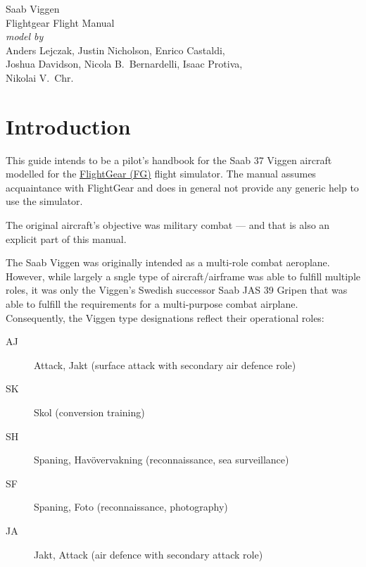 \usepackage[english]{babel}
\usepackage[utf8]{inputenc}
\usepackage[T1]{fontenc}

\usepackage{graphicx}
\usepackage{hyperref}
\usepackage{wallpaper}
\usepackage{xcolor}
\usepackage{geometry}

\pagestyle{headings}


\begin{titlepage}
  \centering
  \sf
  {\Huge Saab  Viggen}
  \\[1cm]
  {\Huge Flightgear Flight Manual}
  \\[16cm]
  \color{white}
  \emph{model by}\\
  Anders Lejczak, Justin Nicholson, Enrico Castaldi,\\
  Joshua Davidson, Nicola B.\ Bernardelli, Isaac Protiva,\\
  Nikolai V.\ Chr.
\end{titlepage}
\restoregeometry

\tableofcontents

\chapter{Introduction}

This guide intends to be a pilot's handbook for the Saab 37 Viggen aircraft modelled for the \href{http://www.flightgear.org}{FlightGear (FG)} flight simulator. The manual assumes acquaintance with FlightGear and does in general not provide any generic help to use the simulator.

The original aircraft's objective was military combat --- and that is also an explicit part of this manual.

The Saab Viggen was originally intended as a multi-role combat aeroplane. However, while largely a sngle type of aircraft/airframe was able to fulfill multiple roles, it was only the Viggen's Swedish successor Saab JAS 39 Gripen that was able to fulfill the requirements for a multi-purpose combat airplane. Consequently, the Viggen type designations reflect their operational roles:
\begin{description}
\item[AJ] Attack, Jakt (surface attack with secondary air defence role)
\item[SK] Skol (conversion training)
\item[SH] Spaning, Havövervakning (reconnaissance, sea surveillance)
\item[SF] Spaning, Foto (reconnaissance, photography)
\item[JA] Jakt, Attack (air defence with secondary attack role)
\end{description}

